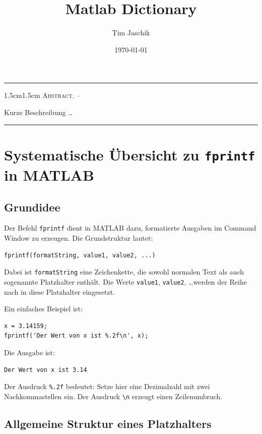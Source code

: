 \documentclass[10pt, letterpaper]{article}
\title{Matlab Dictionary}
\author{Tim Jaschik}
\date{\today}
\renewenvironment{abstract}
  {
    \begin{adjustwidth}{1.5cm}{1.5cm}
    \small
    \textsc{Abstract. –}%
  }
  {
    \end{adjustwidth}
  }
\begin{document}
\maketitle
\rule{\textwidth}{0.5pt}
\begin{abstract}
Kurze Beschreibung …
\end{abstract}
\rule{\textwidth}{0.5pt}
\vspace{0.5cm}

\tableofcontents

\pagebreak

\section{Systematische Übersicht zu \texttt{fprintf} in MATLAB}

\subsection{Grundidee}

Der Befehl \texttt{fprintf} dient in MATLAB dazu, formatierte Ausgaben im Command Window zu erzeugen. Die Grundstruktur lautet:

\begin{verbatim}
fprintf(formatString, value1, value2, ...)
\end{verbatim}

Dabei ist \texttt{formatString} eine Zeichenkette, die sowohl normalen Text als auch sogenannte Platzhalter enthält. Die Werte \texttt{value1}, \texttt{value2}, \dots werden der Reihe nach in diese Platzhalter eingesetzt.

Ein einfaches Beispiel ist:

\begin{verbatim}
x = 3.14159;
fprintf('Der Wert von x ist %.2f\n', x);
\end{verbatim}

Die Ausgabe ist:

\begin{verbatim}
Der Wert von x ist 3.14
\end{verbatim}

Der Ausdruck \texttt{\%.2f} bedeutet: Setze hier eine Dezimalzahl mit zwei Nachkommastellen ein. Der Ausdruck \texttt{\textbackslash n} erzeugt einen Zeilenumbruch.

\subsection{Allgemeine Struktur eines Platzhalters}
\end{document}
